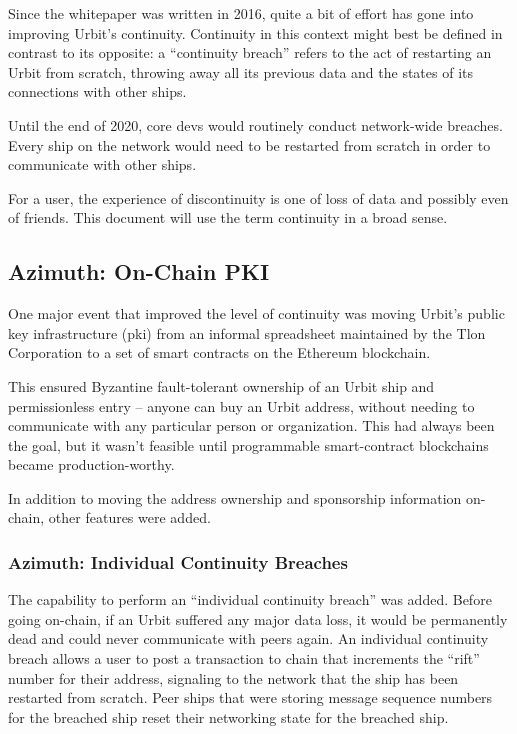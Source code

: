 \documentclass[twoside]{article}
\begin{document}
Since the whitepaper was written in 2016, quite a bit of effort has gone into improving Urbit's continuity.  Continuity in this context might best be defined in contrast to its opposite: a ``continuity breach'' refers to the act of restarting an Urbit from scratch, throwing away all its previous data and the states of its connections with other ships.

Until the end of 2020, core devs would routinely conduct network-wide breaches.  Every ship on the network would need to be restarted from scratch in order to communicate with other ships.

For a user, the experience of discontinuity is one of loss of data and possibly even of friends.  This document will use the term continuity in a broad sense.

\subsection{Azimuth: On-Chain PKI}

One major event that improved the level of continuity was moving Urbit's public key infrastructure ({\sc pki}) from an informal spreadsheet maintained by the Tlon Corporation to a set of smart contracts on the Ethereum blockchain.

This ensured Byzantine fault-tolerant ownership of an Urbit ship and permissionless entry – anyone can buy an Urbit address, without needing to communicate with any particular person or organization.  This had always been the goal, but it wasn't feasible until programmable smart-contract blockchains became production-worthy.

In addition to moving the address ownership and sponsorship information on-chain, other features were added.

\subsubsection{Azimuth: Individual Continuity Breaches}

The capability to perform an ``individual continuity breach'' was added.  Before going on-chain, if an Urbit suffered any major data loss, it would be permanently dead and could never communicate with peers again.  An individual continuity breach allows a user to post a transaction to chain that increments the ``rift'' number for their address, signaling to the network that the ship has been restarted from scratch.  Peer ships that were storing message sequence numbers for the breached ship reset their networking state for the breached ship.
\end{document}
